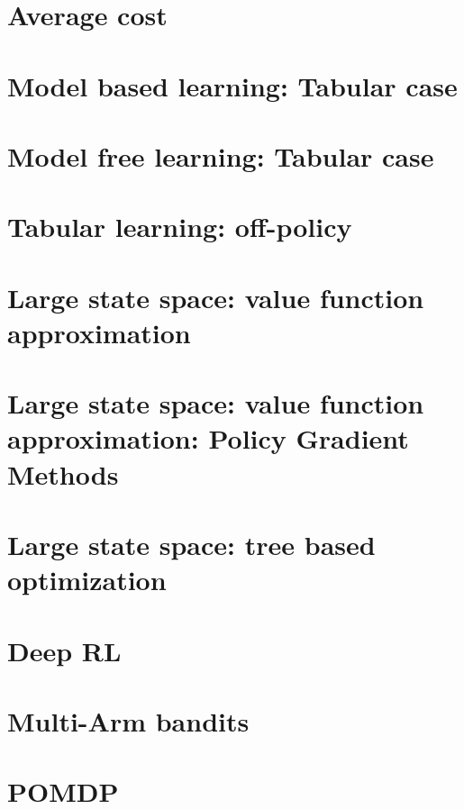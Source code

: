 \documentclass[12pt]{book}
\begin{document}
\chapter{Average cost}
\label{chapter:average}

\chapter{ Model based learning:  Tabular case}

%

\chapter{Model free  learning: Tabular case}
\label{chapter:learning-model-free}



%

\chapter{Tabular learning: off-policy}
%

\chapter{Large state space: value function approximation}

%

\chapter{Large state space: value function approximation: Policy Gradient Methods}
%

\chapter{Large state space: tree based optimization}
%
%

%
%


\chapter{Deep RL}

\chapter{ Multi-Arm bandits}
%

\chapter{POMDP}
\label{chapter:POMDP}
%

\newpage
\appendix

\end{document}
